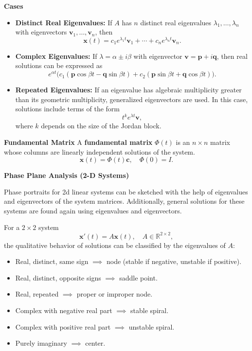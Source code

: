     \textbf{Cases}
    \begin{itemize}
      \item \textbf{Distinct Real Eigenvalues:}  
      If $A$ has $n$ distinct real eigenvalues $\lambda_1, \dots, \lambda_n$ with eigenvectors $\mathbf{v}_1, \dots, \mathbf{v}_n$, then
      \[
      \mathbf{x}(t) = c_1 e^{\lambda_1 t} \mathbf{v}_1 + \cdots + c_n e^{\lambda_n t} \mathbf{v}_n.
      \]

      \item \textbf{Complex Eigenvalues:}  
      If $\lambda = \alpha \pm i\beta$ with eigenvector $\mathbf{v} = \mathbf{p} + i \mathbf{q}$, then real solutions can be expressed as
      \[
      e^{\alpha t} \big( c_1 (\mathbf{p} \cos \beta t - \mathbf{q} \sin \beta t) 
      + c_2 (\mathbf{p} \sin \beta t + \mathbf{q} \cos \beta t) \big).
      \]

      \item \textbf{Repeated Eigenvalues:}  
      If an eigenvalue has algebraic multiplicity greater than its geometric multiplicity, generalized eigenvectors are used. In this case, solutions include terms of the form
      \[
      t^k e^{\lambda t}\mathbf{v},
      \]
      where $k$ depends on the size of the Jordan block.
    \end{itemize}

    \textbf{Fundamental Matrix}
    A \textbf{fundamental matrix} $\Phi(t)$ is an $n \times n$ matrix whose columns are linearly independent solutions of the system.  
    \[
    \mathbf{x}(t) = \Phi(t) \mathbf{c}, \quad \Phi(0) = I.
    \]

    \textbf{Phase Plane Analysis (2-D Systems)}


    \begin{weekintro}
      Phase portraits for 2d linear systems can be sketched with the help of eigenvalues and eigenvectors of the system matrices.
      Additionally, general solutions for these systems are found again using eigenvalues and eigenvectors.
    \end{weekintro}

    For a $2 \times 2$ system
    \[
    \mathbf{x}'(t) = A \mathbf{x}(t), \quad A \in \mathbb{R}^{2 \times 2},
    \]
    the qualitative behavior of solutions can be classified by the eigenvalues of $A$:
    \begin{itemize}
      \item Real, distinct, same sign $\implies$ node (stable if negative, unstable if positive).
      \item Real, distinct, opposite signs $\implies$ saddle point.
      \item Real, repeated $\implies$ proper or improper node.
      \item Complex with negative real part $\implies$ stable spiral.
      \item Complex with positive real part $\implies$ unstable spiral.
      \item Purely imaginary $\implies$ center.
    \end{itemize}

